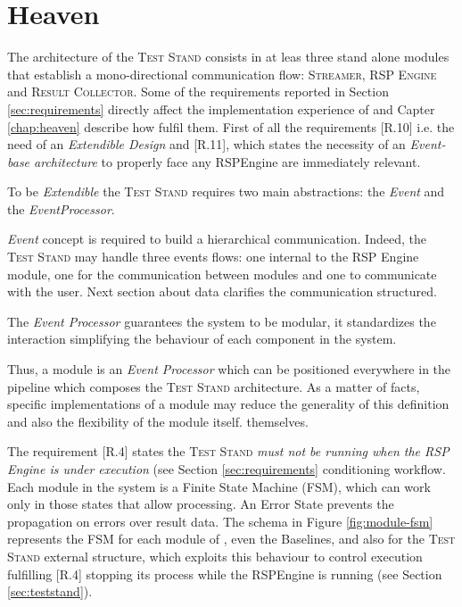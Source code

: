 
\section{Heaven}

The architecture of the \textsc{Test Stand} consists in at leas three stand alone modules that establish a mono-directional communication flow: \textsc{Streamer}, \textsc{RSP Engine} and \textsc{Result Collector}. Some of the requirements reported in Section \ref{sec:requirements} directly affect the implementation experience of \namens and Capter \ref{chap:heaven} describe how fulfil them. First of all the requirements [R.10] i.e. the need of an \textit{Extendible Design} and [R.11], which states the necessity of an \textit{Event-base architecture} to properly face any RSPEngine are immediately relevant. 

To be \textit{Extendible} the \textsc{Test Stand} requires two main abstractions: the \textit{Event} and the \textit{EventProcessor}.

\textit{Event} concept is required to build a hierarchical communication. Indeed, the \textsc{Test Stand} may handle three events flows: one internal to the RSP Engine module, one for the communication between modules and one to communicate with the user. Next section about data clarifies the communication structured. 

The \textit{Event Processor} guarantees the system to be modular, it standardizes the interaction simplifying the behaviour of each component in the system. 

Thus, a module is an \textit{Event Processor} which can be positioned everywhere in the pipeline which composes the \textsc{Test Stand} architecture.  As a matter of facts, specific implementations of a module may reduce the generality of this definition and also the flexibility of the module itself. themselves.	

The requirement [R.4] states the \textsc{Test Stand}\textit{ must not be running when the RSP Engine is under execution} (see Section \ref{sec:requirements} conditioning \name workflow. Each module in the system is a Finite State Machine (FSM), which can work only in those states that allow processing. An Error State prevents the propagation on errors over result data. The  schema in Figure \ref{fig:module-fsm} represents the FSM for each module of \name, even the Baselines, and also for the \textsc{Test Stand} external structure, which exploits this behaviour to control execution fulfilling [R.4] stopping its process while the RSPEngine is running (see Section \ref{sec:teststand}).

